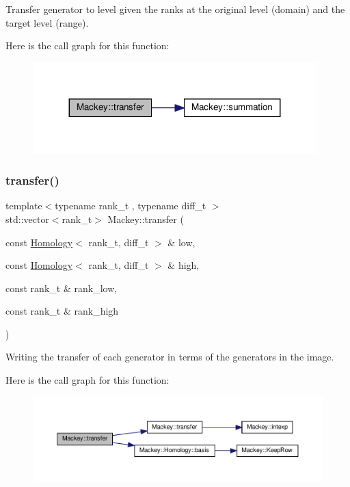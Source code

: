 Transfer generator to level given the ranks at the original level (domain) and the target level (range). 

Here is the call graph for this function\+:\nopagebreak
\begin{figure}[H]
\begin{center}
\leavevmode
\includegraphics[width=311pt]{namespaceMackey_a0550bf97e47b3c319cb5e1bd81008d89_cgraph}
\end{center}
\end{figure}
\mbox{\label{namespaceMackey_a5b14999d16c90eb1fdaa40d31809f662}} 
\subsubsection{\texorpdfstring{transfer()}{transfer()}\hspace{0.1cm}{\footnotesize\ttfamily [6/6]}}
{\footnotesize\ttfamily template$<$typename rank\+\_\+t , typename diff\+\_\+t $>$ \\
std\+::vector$<$rank\+\_\+t$>$ Mackey\+::transfer (\begin{DoxyParamCaption}\item[{const \hyperlink{classMackey_1_1Homology}{Homology}$<$ rank\+\_\+t, diff\+\_\+t $>$ \&}]{low,  }\item[{const \hyperlink{classMackey_1_1Homology}{Homology}$<$ rank\+\_\+t, diff\+\_\+t $>$ \&}]{high,  }\item[{const rank\+\_\+t \&}]{rank\+\_\+low,  }\item[{const rank\+\_\+t \&}]{rank\+\_\+high }\end{DoxyParamCaption})}



Writing the transfer of each generator in terms of the generators in the image. 

Here is the call graph for this function\+:\nopagebreak
\begin{figure}[H]
\begin{center}
\leavevmode
\includegraphics[width=350pt]{namespaceMackey_a5b14999d16c90eb1fdaa40d31809f662_cgraph}
\end{center}
\end{figure}


